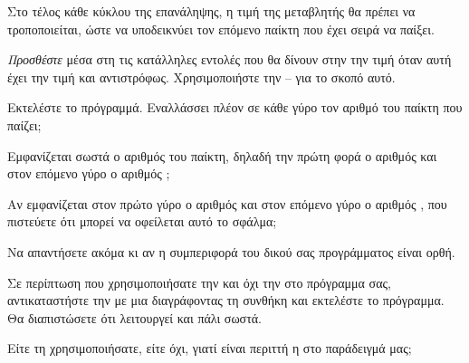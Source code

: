 \documentclass[a4paper,11pt,oneside]{book}
\begin{document}
\begin{step}
\label{step:player-switch}
Στο τέλος κάθε κύκλου της επανάληψης, η τιμή της μεταβλητής  θα πρέπει να τροποποιείται, ώστε να υποδεικνύει τον επόμενο παίκτη που έχει σειρά να παίξει. 

\emph{Προσθέστε} μέσα στη  τις κατάλληλες εντολές που θα δίνουν στην  την τιμή  όταν αυτή έχει την τιμή  και αντιστρόφως. Χρησιμοποιήστε την -- για το σκοπό αυτό. 

Εκτελέστε το πρόγραμμά. Εναλλάσσει πλέον σε κάθε γύρο τον αριθμό του παίκτη που παίζει;

\marginnote[14pt]{\icondiscuss}
\dottedline

Εμφανίζεται σωστά ο αριθμός του παίκτη, δηλαδή την πρώτη φορά ο αριθμός  και στον επόμενο γύρο ο αριθμός ; 

\marginnote[14pt]{\icondiscuss}
\dottedline

Αν εμφανίζεται στον πρώτο γύρο ο αριθμός  και στον επόμενο γύρο ο αριθμός , που πιστεύετε ότι μπορεί να οφείλεται αυτό το σφάλμα;

\begin{note}
Να απαντήσετε ακόμα κι αν η συμπεριφορά του δικού σας προγράμματος είναι ορθή.
\end{note} 

\marginnote[14pt]{\icondiscuss}
\dottedline

\dottedline

Σε περίπτωση που χρησιμοποιήσατε την  και όχι την  στο πρόγραμμα σας, αντικαταστήστε την με μια  διαγράφοντας τη συνθήκη και εκτελέστε το πρόγραμμα. Θα διαπιστώσετε ότι λειτουργεί και πάλι σωστά.

Είτε τη χρησιμοποιήσατε, είτε όχι, γιατί είναι περιττή η  στο παράδειγμά μας;

\marginnote[14pt]{\icondiscuss}
\dottedline

\dottedline

\end{step}
\end{document}
